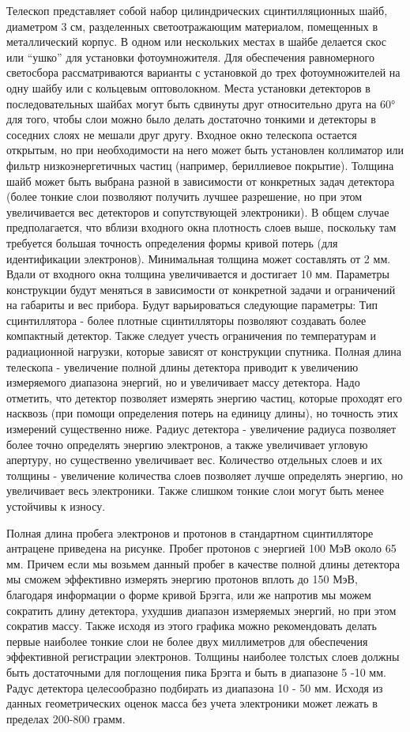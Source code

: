 Телескоп представляет собой набор цилиндрических сцинтилляционных шайб, диаметром 3 см, разделенных светоотражающим материалом, помещенных в металлический корпус. В одном или нескольких местах в шайбе делается скос или “ушко” для установки фотоумножителя. Для обеспечения равномерного светосбора рассматриваются варианты с установкой до трех фотоумножителей на одну шайбу или с кольцевым оптоволокном. Места установки детекторов в последовательных шайбах могут быть сдвинуты друг относительно друга на 60° для того, чтобы слои можно было делать достаточно тонкими и детекторы в соседних слоях не мешали друг другу. Входное окно телескопа остается открытым, но при необходимости на него может быть установлен коллиматор или фильтр низкоэнергетичных частиц (например, бериллиевое покрытие). Толщина шайб может быть выбрана разной в зависимости от конкретных задач детектора (более тонкие слои позволяют получить лучшее разрешение, но при этом увеличивается вес детекторов и сопутствующей электроники). В общем случае предполагается, что вблизи входного окна плотность слоев выше, поскольку там требуется большая точность определения формы кривой потерь (для идентификации электронов). Минимальная толщина может составлять от 2 мм. Вдали от входного окна толщина увеличивается и достигает 10 мм.
Параметры конструкции будут меняться в зависимости от конкретной задачи и ограничений на габариты и вес прибора. Будут варьироваться следующие параметры:
Тип сцинтиллятора - более плотные сцинтилляторы позволяют создавать более компактный детектор. Также следует учесть ограничения по температурам и радиационной нагрузки, которые зависят от конструкции спутника.
Полная длина телескопа - увеличение полной длины детектора приводит к увеличению измеряемого диапазона энергий, но и увеличивает массу детектора. Надо отметить, что детектор позволяет измерять энергию частиц, которые проходят его насквозь (при помощи определения потерь на единицу длины), но точность этих измерений существенно ниже.
Радиус детектора - увеличение радиуса позволяет более точно определять энергию электронов, а также увеличивает угловую апертуру, но существенно увеличивает вес. 
Количество отдельных слоев и их толщины - увеличение количества слоев позволяет лучше определять энергию, но увеличивает весь электроники. Также слишком тонкие слои могут быть менее устойчивы к износу.

Полная длина пробега электронов и протонов в стандартном сцинтилляторе антрацене приведена на рисунке. Пробег протонов с энергией 100 МэВ около 65 мм. Причем если мы возьмем данный пробег в качестве полной длины детектора мы сможем эффективно измерять энергию протонов вплоть до 150 МэВ,  благодаря информации о форме кривой Брэгга, или же напротив мы можем сократить длину детектора, ухудшив диапазон измеряемых энергий, но при этом сократив массу. Также исходя из этого графика можно рекомендовать делать первые наиболее тонкие слои не более двух миллиметров для обеспечения эффективной регистрации электронов. Толщины наиболее толстых слоев должны быть достаточными для поглощения пика Брэгга и быть в диапазоне 5 -10 мм. Радус детектора целесообразно подбирать из диапазона 10 - 50 мм. Исходя из данных геометрических оценок масса без учета электроники может лежать в пределах 200-800 грамм.

